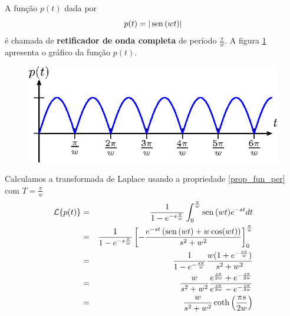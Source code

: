 \begin{ex} A função $p(t)$ dada por
\begin{equation}
p(t)=|\operatorname{sen}\,(wt)|
\end{equation}
é chamada de {\bf retificador de onda completa} de período $\frac{\pi}{w}$. A figura \ref{fig_ret_onda_completa} apresenta o gráfico da função $p(t)$.
 \begin{figure}[!ht]
\begin{center}

\includegraphics{cap_especiais_coef_var/pics/figura_4}\end{center}
\caption{\label{fig_ret_onda_completa}}
\end{figure}
Calculamos a transformada de Laplace usando a propriedade \ref{prop_fun_per} com $T=\frac{\pi}{w}$
\begin{eqnarray*}
\mathcal{L}\{p(t)\}&=& \frac{1}{1-e^{-s\frac{\pi}{w}}}\int_0^{\frac{\pi}{w}}\operatorname{sen}\,(wt)e^{-st}dt\\
&=& \frac{1}{1-e^{-s\frac{\pi}{w}}} \left[-\frac{e^{-st}\left(\operatorname{sen}\,(wt)+w\cos(wt)\right)}{s^2+w^2}\right]_0^{\frac{\pi}{w}}\\
&=& \frac{1}{1-e^{-\frac{s\pi}{w}}} \frac{w(1+e^{-\frac{s\pi}{w}})}{s^2+w^2}\\
&=&  \frac{w}{s^2+w^2}\frac{e^{\frac{s\pi}{2w}}+e^{-\frac{s\pi}{2w}}}{e^{\frac{s\pi}{2w}}-e^{-\frac{s\pi}{2w}}}\\
&=&  \frac{w}{s^2+w^2}\coth\left( \frac{\pi s}{2w}\right)
\end{eqnarray*}
\end{ex}
